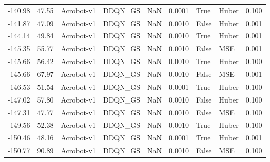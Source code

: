 \begin{tabular}{rrlllrllr}
-140.98 &   47.55 &      Acrobot-v1 &  DDQN\_GS &    NaN &  0.0001 &      True &         Huber &         0.100 \\
-141.87 &   47.09 &      Acrobot-v1 &  DDQN\_GS &    NaN &  0.0010 &     False &         Huber &         0.001 \\
-144.14 &   49.84 &      Acrobot-v1 &  DDQN\_GS &    NaN &  0.0010 &      True &         Huber &         0.001 \\
-145.35 &   55.77 &      Acrobot-v1 &  DDQN\_GS &    NaN &  0.0010 &     False &           MSE &         0.001 \\
-145.66 &   56.42 &      Acrobot-v1 &  DDQN\_GS &    NaN &  0.0010 &      True &         Huber &         0.100 \\
-145.66 &   67.97 &      Acrobot-v1 &  DDQN\_GS &    NaN &  0.0010 &     False &           MSE &         0.001 \\
-146.53 &   51.54 &      Acrobot-v1 &  DDQN\_GS &    NaN &  0.0001 &      True &         Huber &         0.100 \\
-147.02 &   57.80 &      Acrobot-v1 &  DDQN\_GS &    NaN &  0.0010 &     False &         Huber &         0.100 \\
-147.31 &   47.77 &      Acrobot-v1 &  DDQN\_GS &    NaN &  0.0010 &     False &           MSE &         0.100 \\
-149.56 &   52.38 &      Acrobot-v1 &  DDQN\_GS &    NaN &  0.0010 &      True &         Huber &         0.100 \\
-150.46 &   48.16 &      Acrobot-v1 &  DDQN\_GS &    NaN &  0.0001 &      True &         Huber &         0.001 \\
-150.77 &   90.89 &      Acrobot-v1 &  DDQN\_GS &    NaN &  0.0010 &     False &           MSE &         0.100 \\
\bottomrule
\end{tabular}
